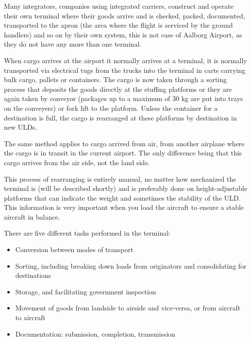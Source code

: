 Many integrators, companies using integrated carriers, construct and operate their own terminal where their goods arrive and is checked, packed, documented, transported to the apron (the area where the flight is serviced by the ground handlers) and so on by their own system, this is not case of Aalborg Airport, as they do not have any more than one terminal. 

When cargo arrives at the airport it normally arrives at a terminal, it is normally transported via electrical tugs from the trucks into the terminal in carts carrying bulk cargo, pallets or containers. The cargo is now taken through a sorting process that deposits the goods directly at the stuffing platforms or they are again taken by conveyor (packages up to a maximum of 30 kg are put into trays on the conveyers) or fork lift to the platform.
Unless the container for a destination is full, the cargo is rearranged at these platforms by destination in new ULDs.


The same method applies to cargo arrived from air, from another airplane where the cargo is in transit in the current airport. The only difference being that this cargo arrives from the air side, not the land side.

This process of rearranging is entirely manual, no matter how mechanized the terminal is (will be described shortly) and is preferably done on height-adjustable platforms that can indicate the weight and sometimes the stability of the ULD. This information is very important when you load the aircraft to ensure a stable aircraft in balance.


There are five different tasks performed in the terminal:
\begin{itemize}
\item Conversion between modes of transport
\item Sorting, including breaking down loads from originators and consolidating for destinations
\item Storage, and facilitating government inspection
\item Movement of goods from landside to airside and vice-versa, or from aircraft to aircraft
\item Documentation: submission, completion, transmission
\end{itemize}

